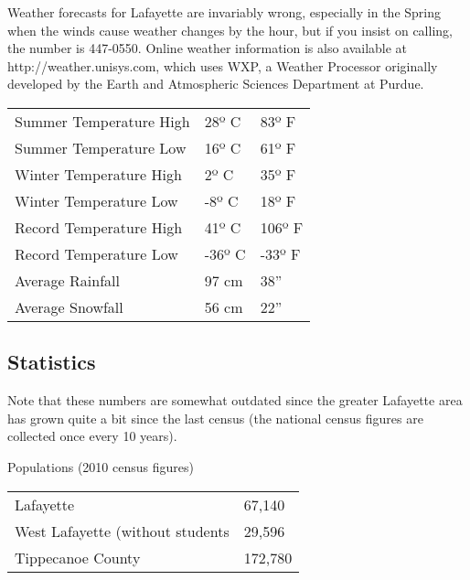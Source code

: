 Weather forecasts for Lafayette are invariably wrong, especially in the Spring when the winds cause weather changes by the hour, but if you insist on calling, the number is 447-0550. Online weather information is also available at http://weather.unisys.com, which uses WXP, a Weather Processor originally developed by the Earth and Atmospheric Sciences Department at Purdue.

\begin{table}[H]
	\centering
	\begin{tabular}{@{}lll@{}}
		\toprule
		Summer Temperature High & 28º C & 83º F \\
		Summer Temperature Low & 16º C & 61º F \\
		Winter Temperature High & 2º C & 35º F \\
		Winter Temperature Low & -8º C & 18º F \\
		Record Temperature High & 41º C & 106º F \\
		Record Temperature Low & -36º C & -33º F \\
		Average Rainfall & 97 cm & 38” \\
		Average Snowfall & 56 cm & 22” \\
		\bottomrule
	\end{tabular}
\end{table}



\subsection{Statistics}
Note that these numbers are somewhat outdated since the greater Lafayette area has grown quite a bit since the last census (the national census figures are collected once every 10 years).

Populations (2010 census figures)

\begin{table}[H]
	\centering
	\begin{tabular}{@{}ll@{}}
		\toprule
		Lafayette & 67,140 \\
		West Lafayette (without students & 29,596 \\
		Tippecanoe County & 172,780 \\
		\bottomrule
	\end{tabular}
\end{table}


